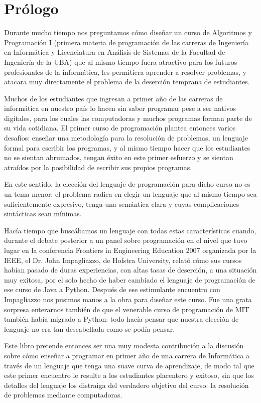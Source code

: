 \chapter*{Prólogo}

Durante mucho tiempo nos preguntamos cómo diseñar un curso de Algoritmos y Programación I
(primera materia de programación de las carreras de Ingeniería en Informática y Licenciatura
en Análisis de Sistemas de la Facultad de Ingeniería de la UBA) que al mismo tiempo fuera
atractivo para los futuros profesionales de la informática, les permitiera aprender a resolver
problemas, y atacara muy directamente el problema de la deserción temprana de estudiantes.


Muchos de los estudiantes que ingresan a primer año de las carreras de informática en nuestro
país lo hacen sin saber programar pese a ser nativos digitales, para los cuales las computadoras
y muchos programas forman parte de su vida cotidiana. El primer curso de programación plantea
entonces varios desafíos: enseñar una metodología para la resolución de problemas, un lenguaje
formal para escribir los programas, y al mismo tiempo hacer que los estudiantes no se sientan
abrumados, tengan éxito en este primer esfuerzo y se sientan atraídos por la posibilidad de
escribir sus propios programas.


En este sentido, la elección del lenguaje de programación para dicho curso no es un tema menor:
el problema radica en elegir un lenguaje que al mismo tiempo sea suficientemente expresivo, tenga
una semántica clara y cuyas complicaciones sintácticas sean mínimas.


Hacía tiempo que buscábamos un lenguaje con todas estas características cuando, durante el debate
posterior a un panel sobre programación en el nivel que tuvo lugar en la conferencia Frontiers in
Engineering Education 2007 organizada por la IEEE, el Dr. John Impagliazzo, de Hofstra University,
relató cómo sus cursos habían pasado de duras experiencias, con altas tasas de deserción, a una
situación muy exitosa, por el solo hecho de haber cambiado el lenguaje de programación de ese curso
de Java a Python. Después de ese estimulante encuentro con Impagliazzo nos pusimos manos a la obra
para diseñar este curso. Fue una grata sorpresa enterarnos también de que el venerable curso de
programación de MIT también había migrado a Python: todo hacía pensar que nuestra elección de lenguaje
no era tan descabellada como se podía pensar.


Este libro pretende entonces ser una muy modesta contribución a la discusión sobre cómo enseñar a
programar en primer año de una carrera de Informática a través de un lenguaje que tenga una suave
curva de aprendizaje, de modo tal que este primer encuentro le resulte a los estudiantes placentero
y exitoso, sin que los detalles del lenguaje los distraiga del verdadero objetivo del curso: la resolución
de problemas mediante computadoras.

